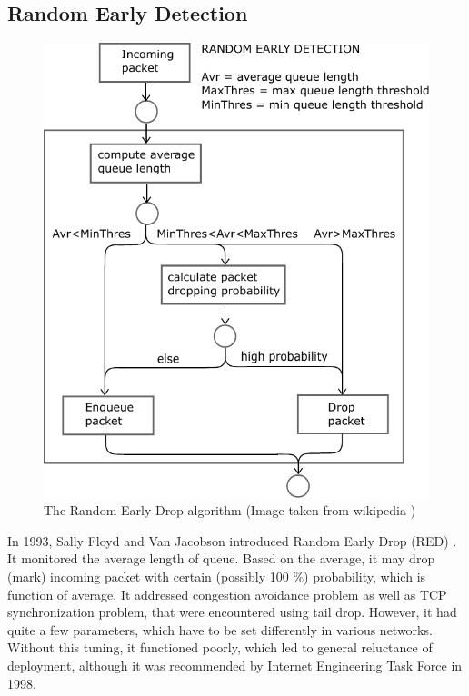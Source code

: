 \subsection{Random Early Detection}

\begin{figure}
	\centering
	\includegraphics[width=137mm]{drawings/RED}
	\caption{The Random Early Drop algorithm  (Image taken from wikipedia \cite{RED:picture}) }
	
	\label{fig04:RED}
\end{figure}


In 1993, Sally Floyd and Van Jacobson introduced Random Early Drop (RED) \cite{Floyd:1993:RED:169931.169935}. It monitored the average length of queue. Based on the average, it may drop (mark) incoming packet with certain (possibly 100 \%) probability, which is function of average. It addressed congestion avoidance problem as well as TCP synchronization problem, that were encountered using tail drop. However, it had quite a few parameters, which have to be set differently in various networks. Without this tuning, it functioned poorly, which led to general reluctance of deployment, although it was recommended by Internet Engineering Task Force \cite{rfc2309} in 1998.

